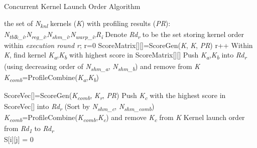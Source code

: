 \documentclass[twocolumn]{el-author}
\begin{document}
\begin{algorithm}
\scriptsize
	\caption{Concurrent Kernel Launch Order Algorithm}
	\label{alg:symbiosis}
	\begin{algorithmic}[5]
\renewcommand{\algorithmicrequire}{\textbf{Input:}}
		\renewcommand{\algorithmicensure}{\textbf{Output:}}
		\Require the set of \emph{N\textsubscript{knl}} kernels (\emph{K}) with profiling results (\emph{PR}): \emph{N\textsubscript{tblk\_i}},\emph{N\textsubscript{reg\_i}},\emph{N\textsubscript{shm\_i}},\emph{N\textsubscript{warp\_i}},\emph{R\textsubscript{i}}
		\State Denote \emph{Rd\textsubscript{r}} to be the set storing kernel order within \emph{execution round r}; r=0 \State ScoreMatrix[][]=ScoreGen(\emph{K}, \emph{K}, \emph{PR})
		\State r++ 		
		\State Within \emph{K}, find kernel \emph{K\textsubscript{a}},\emph{K\textsubscript{b}} with highest score in ScoreMatrix[][]
		\State Push \emph{K\textsubscript{a}},\emph{K\textsubscript{b}} into \emph{Rd\textsubscript{r}} (using decreasing order of \emph{N\textsubscript{shm\_a}}, \emph{N\textsubscript{shm\_b}}) and remove from \emph{K} 
		\State \emph{K\textsubscript{comb}}=ProfileCombine(\emph{K\textsubscript{a}},\emph{K\textsubscript{b}})

		\State ScoreVec[]=ScoreGen(\emph{K\textsubscript{comb}}, \emph{K\textsubscript{r}}, \emph{PR})
		\State Push \emph{K\textsubscript{c}} with the highest score in ScoreVec[] into \emph{Rd\textsubscript{r}} (Sort by \emph{N\textsubscript{shm\_c}}, \emph{N\textsubscript{shm\_comb}}) 
		\State \emph{K\textsubscript{comb}}=ProfileCombine(\emph{K\textsubscript{comb}},\emph{K\textsubscript{c}}) and remove \emph{K\textsubscript{c}} from \emph{K}
		\EndFor
		\EndWhile
		\Ensure Kernel launch order from \emph{Rd\textsubscript{1}} to \emph{Rd\textsubscript{r}} 
		\vspace{-4.5pt}
		\\\dotfill
		\vspace{-1.5pt}
		 
S[i][j] = 0
		\Else




\end{algorithmic}
\end{algorithm}
\end{document}
